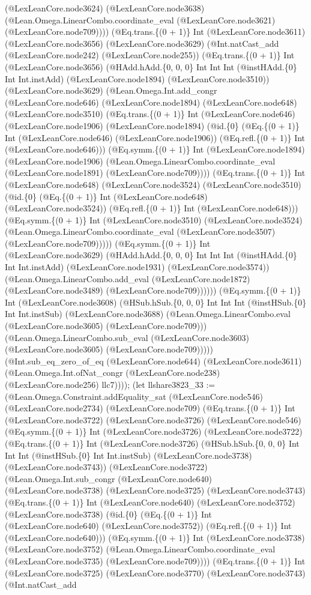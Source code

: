 \documentclass[11pt]{article}
\begin{document}
(@LexLeanCore.node3624) (@LexLeanCore.node3638) (@Lean.Omega.LinearCombo.coordinate\_eval (@LexLeanCore.node3621) (@LexLeanCore.node709)))) (@Eq.trans.\{(0 + 1)\} Int (@LexLeanCore.node3611) (@LexLeanCore.node3656) (@LexLeanCore.node3629) (@Int.natCast\_add (@LexLeanCore.node242) (@LexLeanCore.node255)) (@Eq.trans.\{(0 + 1)\} Int (@LexLeanCore.node3656) (@HAdd.hAdd.\{0, 0, 0\} Int Int Int (@instHAdd.\{0\} Int Int.instAdd) (@LexLeanCore.node1894) (@LexLeanCore.node3510)) (@LexLeanCore.node3629) (@Lean.Omega.Int.add\_congr (@LexLeanCore.node646) (@LexLeanCore.node1894) (@LexLeanCore.node648) (@LexLeanCore.node3510) (@Eq.trans.\{(0 + 1)\} Int (@LexLeanCore.node646) (@LexLeanCore.node1906) (@LexLeanCore.node1894) (@id.\{0\} (@Eq.\{(0 + 1)\} Int (@LexLeanCore.node646) (@LexLeanCore.node1906)) (@Eq.refl.\{(0 + 1)\} Int (@LexLeanCore.node646))) (@Eq.symm.\{(0 + 1)\} Int (@LexLeanCore.node1894) (@LexLeanCore.node1906) (@Lean.Omega.LinearCombo.coordinate\_eval (@LexLeanCore.node1891) (@LexLeanCore.node709)))) (@Eq.trans.\{(0 + 1)\} Int (@LexLeanCore.node648) (@LexLeanCore.node3524) (@LexLeanCore.node3510) (@id.\{0\} (@Eq.\{(0 + 1)\} Int (@LexLeanCore.node648) (@LexLeanCore.node3524)) (@Eq.refl.\{(0 + 1)\} Int (@LexLeanCore.node648))) (@Eq.symm.\{(0 + 1)\} Int (@LexLeanCore.node3510) (@LexLeanCore.node3524) (@Lean.Omega.LinearCombo.coordinate\_eval (@LexLeanCore.node3507) (@LexLeanCore.node709))))) (@Eq.symm.\{(0 + 1)\} Int (@LexLeanCore.node3629) (@HAdd.hAdd.\{0, 0, 0\} Int Int Int (@instHAdd.\{0\} Int Int.instAdd) (@LexLeanCore.node1931) (@LexLeanCore.node3574)) (@Lean.Omega.LinearCombo.add\_eval (@LexLeanCore.node1872) (@LexLeanCore.node3489) (@LexLeanCore.node709)))))) (@Eq.symm.\{(0 + 1)\} Int (@LexLeanCore.node3608) (@HSub.hSub.\{0, 0, 0\} Int Int Int (@instHSub.\{0\} Int Int.instSub) (@LexLeanCore.node3688) (@Lean.Omega.LinearCombo.eval (@LexLeanCore.node3605) (@LexLeanCore.node709))) (@Lean.Omega.LinearCombo.sub\_eval (@LexLeanCore.node3603) (@LexLeanCore.node3605) (@LexLeanCore.node709))))) (@Int.sub\_eq\_zero\_of\_eq (@LexLeanCore.node644) (@LexLeanCore.node3611) (@Lean.Omega.Int.ofNat\_congr (@LexLeanCore.node238) (@LexLeanCore.node256) llc7)))); (let llshare3823\_33 := (@Lean.Omega.Constraint.addEquality\_sat (@LexLeanCore.node546) (@LexLeanCore.node2734) (@LexLeanCore.node709) (@Eq.trans.\{(0 + 1)\} Int (@LexLeanCore.node3722) (@LexLeanCore.node3726) (@LexLeanCore.node546) (@Eq.symm.\{(0 + 1)\} Int (@LexLeanCore.node3726) (@LexLeanCore.node3722) (@Eq.trans.\{(0 + 1)\} Int (@LexLeanCore.node3726) (@HSub.hSub.\{0, 0, 0\} Int Int Int (@instHSub.\{0\} Int Int.instSub) (@LexLeanCore.node3738) (@LexLeanCore.node3743)) (@LexLeanCore.node3722) (@Lean.Omega.Int.sub\_congr (@LexLeanCore.node640) (@LexLeanCore.node3738) (@LexLeanCore.node3725) (@LexLeanCore.node3743) (@Eq.trans.\{(0 + 1)\} Int (@LexLeanCore.node640) (@LexLeanCore.node3752) (@LexLeanCore.node3738) (@id.\{0\} (@Eq.\{(0 + 1)\} Int (@LexLeanCore.node640) (@LexLeanCore.node3752)) (@Eq.refl.\{(0 + 1)\} Int (@LexLeanCore.node640))) (@Eq.symm.\{(0 + 1)\} Int (@LexLeanCore.node3738) (@LexLeanCore.node3752) (@Lean.Omega.LinearCombo.coordinate\_eval (@LexLeanCore.node3735) (@LexLeanCore.node709)))) (@Eq.trans.\{(0 + 1)\} Int (@LexLeanCore.node3725) (@LexLeanCore.node3770) (@LexLeanCore.node3743) (@Int.natCast\_add 
\end{document}
